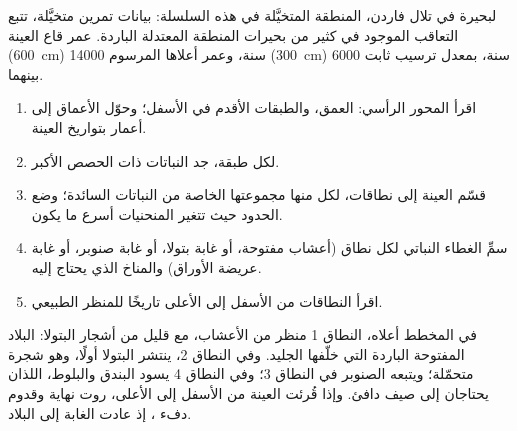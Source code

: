 \begin{omfigure}

{\small {} لبحيرة في تلال فاردن، المنطقة المتخيَّلة
في هذه السلسلة: بيانات تمرين متخيَّلة، تتبع التعاقب الموجود في كثير من
بحيرات المنطقة المعتدلة الباردة. عمر قاع العينة (\qty{600}{cm})
\num{14000} سنة، وعمر أعلاها المرسوم (\qty{300}{cm}) \num{6000} سنة،
بمعدل ترسيب ثابت بينهما.}
\end{omfigure}

\begin{method}
\begin{enumerate}
  \item اقرأ المحور الرأسي: العمق، والطبقات الأقدم في الأسفل؛
        وحوّل الأعماق إلى أعمار بتواريخ العينة.
  \item لكل طبقة، جد النباتات ذات الحصص الأكبر.
  \item قسّم العينة إلى نطاقات، لكل منها مجموعتها الخاصة من النباتات
        السائدة؛ وضع الحدود حيث تتغير المنحنيات أسرع ما يكون.
  \item سمِّ الغطاء النباتي لكل نطاق (أعشاب مفتوحة، أو غابة بتولا، أو غابة
        صنوبر، أو غابة عريضة الأوراق) والمناخ الذي يحتاج إليه.
  \item اقرأ النطاقات من الأسفل إلى الأعلى تاريخًا للمنظر الطبيعي.
\end{enumerate}
\end{method}

في المخطط أعلاه، النطاق 1 منظر من الأعشاب، مع قليل من أشجار البتولا:
البلاد المفتوحة الباردة التي خلّفها الجليد. وفي النطاق 2، ينتشر البتولا أولًا، وهو شجرة
متحمّلة؛ ويتبعه الصنوبر في النطاق 3؛ وفي النطاق 4 يسود البندق والبلوط، اللذان يحتاجان إلى صيف
دافئ. وإذا قُرئت العينة من الأسفل إلى الأعلى، روت نهاية
 وقدوم دفء ، إذ
عادت الغابة إلى البلاد.

